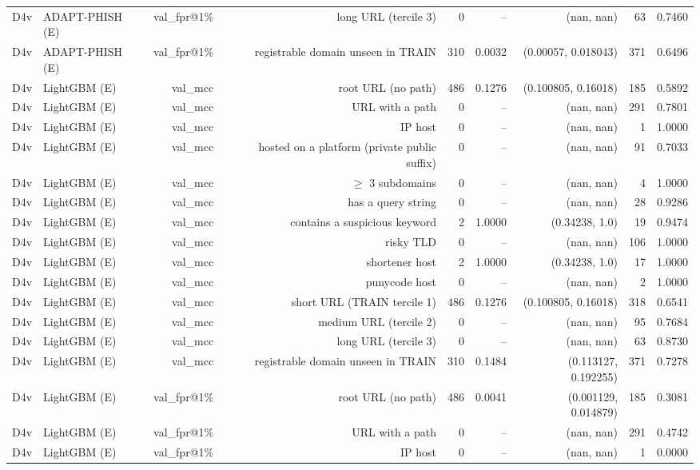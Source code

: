 \begin{table}[t]
\begin{tabular}{llrrrrrrr}
D4v & ADAPT-PHISH (E) & val\_fpr@1\% & long URL (tercile 3) & 0 & -- & (nan, nan) & 63 & 0.7460 \\
D4v & ADAPT-PHISH (E) & val\_fpr@1\% & registrable domain unseen in TRAIN & 310 & 0.0032 & (0.00057, 0.018043) & 371 & 0.6496 \\
D4v & LightGBM (E) & val\_mcc & root URL (no path) & 486 & 0.1276 & (0.100805, 0.16018) & 185 & 0.5892 \\
D4v & LightGBM (E) & val\_mcc & URL with a path & 0 & -- & (nan, nan) & 291 & 0.7801 \\
D4v & LightGBM (E) & val\_mcc & IP host & 0 & -- & (nan, nan) & 1 & 1.0000 \\
D4v & LightGBM (E) & val\_mcc & hosted on a platform (private public suffix) & 0 & -- & (nan, nan) & 91 & 0.7033 \\
D4v & LightGBM (E) & val\_mcc & $\geq$ 3 subdomains & 0 & -- & (nan, nan) & 4 & 1.0000 \\
D4v & LightGBM (E) & val\_mcc & has a query string & 0 & -- & (nan, nan) & 28 & 0.9286 \\
D4v & LightGBM (E) & val\_mcc & contains a suspicious keyword & 2 & 1.0000 & (0.34238, 1.0) & 19 & 0.9474 \\
D4v & LightGBM (E) & val\_mcc & risky TLD & 0 & -- & (nan, nan) & 106 & 1.0000 \\
D4v & LightGBM (E) & val\_mcc & shortener host & 2 & 1.0000 & (0.34238, 1.0) & 17 & 1.0000 \\
D4v & LightGBM (E) & val\_mcc & punycode host & 0 & -- & (nan, nan) & 2 & 1.0000 \\
D4v & LightGBM (E) & val\_mcc & short URL (TRAIN tercile 1) & 486 & 0.1276 & (0.100805, 0.16018) & 318 & 0.6541 \\
D4v & LightGBM (E) & val\_mcc & medium URL (tercile 2) & 0 & -- & (nan, nan) & 95 & 0.7684 \\
D4v & LightGBM (E) & val\_mcc & long URL (tercile 3) & 0 & -- & (nan, nan) & 63 & 0.8730 \\
D4v & LightGBM (E) & val\_mcc & registrable domain unseen in TRAIN & 310 & 0.1484 & (0.113127, 0.192255) & 371 & 0.7278 \\
D4v & LightGBM (E) & val\_fpr@1\% & root URL (no path) & 486 & 0.0041 & (0.001129, 0.014879) & 185 & 0.3081 \\
D4v & LightGBM (E) & val\_fpr@1\% & URL with a path & 0 & -- & (nan, nan) & 291 & 0.4742 \\
D4v & LightGBM (E) & val\_fpr@1\% & IP host & 0 & -- & (nan, nan) & 1 & 0.0000 \\

\end{tabular}
\end{table}
